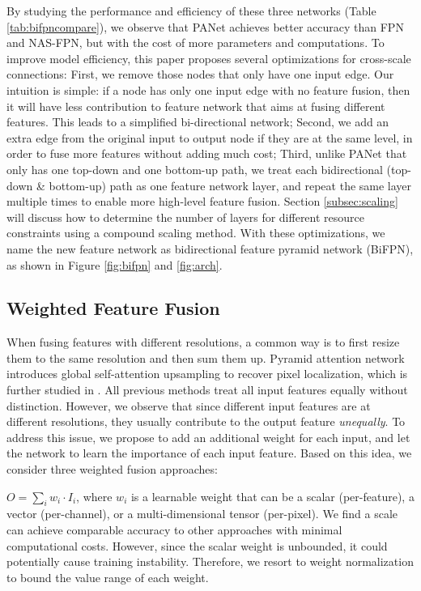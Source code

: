 \documentclass[10pt,twocolumn,letterpaper]{article}
\begin{document}
By studying the performance and efficiency of these three networks (Table \ref{tab:bifpncompare}), we observe that PANet achieves better accuracy than FPN and NAS-FPN, but with the cost of more parameters and  computations. To improve model efficiency, this paper proposes several optimizations for cross-scale connections: First, we remove those nodes that only have one input edge. Our intuition is simple: if a node has only one input edge with no feature  fusion, then it will have less contribution to feature network that aims at fusing different features. This leads to a simplified bi-directional network;  Second, we add an extra edge from the original input to output node if they are at the same level, in order to fuse more features without adding much cost; Third, unlike PANet \cite{panet18} that only has one top-down and one bottom-up path, we treat each bidirectional (top-down \& bottom-up) path as one feature network layer, and repeat the same layer multiple times to enable more high-level feature fusion. Section \ref{subsec:scaling} will discuss how to determine the number of layers for different resource constraints using a compound scaling method.  With these optimizations, we name the new feature network as bidirectional feature pyramid network (BiFPN), as shown in Figure \ref{fig:bifpn} and  \ref{fig:arch}.



\subsection{Weighted Feature Fusion}
\label{subsec:attention}

When fusing features with different resolutions, a common way is to first resize them to the same resolution and then sum them up.  Pyramid attention network \cite{pan18} introduces global self-attention upsampling to recover pixel localization, which is further studied in \cite{nasfpn19}. All previous methods treat all input features equally without distinction. However, we observe that since different input features are at different resolutions, they usually contribute to the output feature \emph{unequally}. To address this issue, we propose to add an additional weight for each input, and let the network to learn the importance of each input feature. Based on this idea, we consider three weighted fusion approaches:

\medbreak
\noindent {} $O = \sum_{i} w_i \cdot I_i $, where $w_i$ is a learnable weight that can be a scalar (per-feature), a vector (per-channel), or a multi-dimensional tensor (per-pixel). We find a scale can achieve comparable accuracy to other approaches with minimal computational costs. However, since the scalar weight is unbounded, it could potentially cause training instability. Therefore, we resort to weight normalization to bound the value range of each weight.
\end{document}
